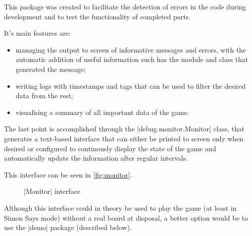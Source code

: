 This package was created to facilitate the detection of errors in the code
during development and to test the functionality of completed parts.

\beforelist It's main features are:
\begin{itemize}
  \item managing the output to screen of informative messages and errors, with
    the automatic addition of useful information such has the module and class
    that generated the message;
  \item writing logs with timestamps and tags that can be used to filter the
    desired data from the rest;
  \item visualising a summary of all important data of the game.
\end{itemize}
\afterlist*
The last point is accomplished through the \Code|debug.monitor.Monitor| class,
that generates a text-based interface that can either be printed to screen only
when desired or configured to continously display the state of the game and
automatically update the information after regular intervals.

This interface can be seen in \autoref{fig:monitor}.

\begin{figure}[h]
  

  \caption[ interface]{\Code|Monitor| interface}
  \label{fig:monitor}
\end{figure}

Although this interface could in theory be used to play the game (at least in
Simon Says mode) without a real board at disposal, a better option would be to
use the \Code|demo| package (described below).
